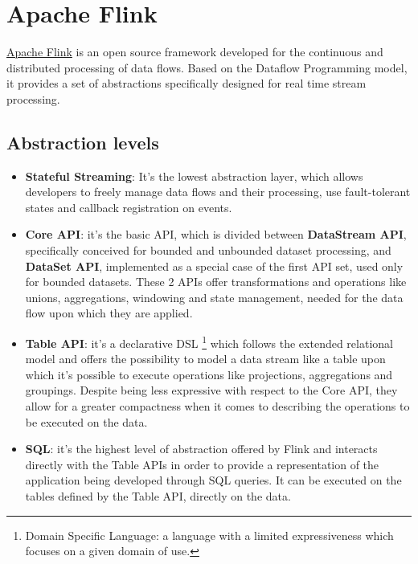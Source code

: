 \pagebreak
\section{Apache Flink}\label{Flink}

\href{https://flink.apache.org/}{Apache Flink} is an open source framework developed for the continuous and distributed processing of data flows. Based on the Dataflow Programming model, it provides a set of abstractions specifically designed for real time stream processing.

\subsection{Abstraction levels}  \label{AbstractionLevels}

\begin{itemize}
	\item \textbf{Stateful Streaming}: It's the lowest abstraction layer, which allows developers to freely manage data flows and their processing, use fault-tolerant states and callback registration on events.
	\item \textbf{Core API}: it's the basic API, which is divided between \textbf{DataStream API}, specifically conceived for bounded and unbounded dataset processing, and \textbf{DataSet API}, implemented as a special case of the first API set, used only for bounded datasets. These 2 APIs offer transformations and operations like unions, aggregations, windowing and state management, needed for the data flow upon which they are applied.
	\item \textbf{Table API}: it's a declarative DSL \footnote{Domain Specific Language: a language with a limited expressiveness which focuses on a given domain of use.} which follows the extended relational model and offers the possibility to model a data stream like a table upon which it's possible to execute operations like projections, aggregations and groupings. Despite being less expressive with respect to the Core API, they allow for a greater compactness when it comes to describing the operations to be executed on the data.
	\item \textbf{SQL}: it's the highest level of abstraction offered by Flink and interacts directly with the Table APIs in order to provide a representation of the application being developed through SQL queries. It can be executed on the tables defined by the Table API, directly on the data.
\end{itemize}

